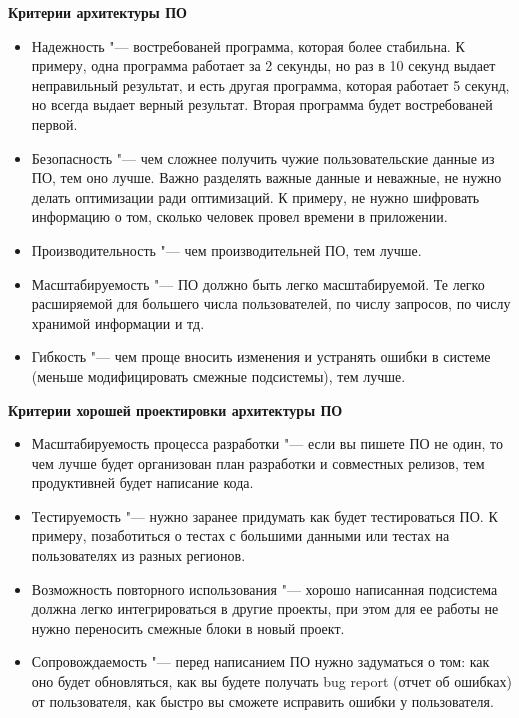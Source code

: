 \documentclass[bachelor, och, pract]{SCWorks}
\theoremstyle{remark}
\begin{document}
    \hfill \break
    \textbf{Критерии архитектуры ПО}

    \begin{itemize}[label=$\bullet$]
        \item Надежность "--- востребованей программа, которая более стабильна. К примеру, одна программа работает за 2 секунды, но раз в 10 секунд выдает неправильный результат, и есть другая программа, которая работает 5 секунд, но всегда выдает верный результат. Вторая программа будет востребованей первой.
        \item Безопасность "--- чем сложнее получить чужие пользовательские данные из ПО, тем оно лучше. Важно разделять важные данные и неважные, не нужно делать оптимизации ради оптимизаций. К примеру, не нужно шифровать информацию о том, сколько человек провел времени в приложении. 
        \item Производительность "--- чем производительней ПО, тем лучше. 
        \item Масштабируемость "--- ПО должно быть легко масштабируемой. Те легко расширяемой для большего числа пользователей, по числу запросов, по числу хранимой информации и тд.
        \item Гибкость "--- чем проще вносить изменения и устранять ошибки в системе (меньше модифицировать смежные подсистемы), тем лучше.
    \end{itemize}

    \hfill \break
    \textbf{Критерии хорошей проектировки архитектуры ПО}

    \begin{itemize}[label=$\bullet$]
        \item Масштабируемость процесса разработки "--- если вы пишете ПО не один, то чем лучше будет организован план разработки и совместных релизов, тем продуктивней будет написание кода.
        \item Тестируемость "--- нужно заранее придумать как будет тестироваться ПО. К примеру, позаботиться о тестах с большими данными или тестах на пользователях из разных регионов.
        \item Возможность повторного использования "--- хорошо написанная подсистема должна легко интегрироваться в другие проекты, при этом для ее работы не нужно переносить смежные блоки в новый проект.
        \item Сопровождаемость "--- перед написанием ПО нужно задуматься о том: как оно будет обновляться, как вы будете получать bug report (отчет об ошибках) от пользователя, как быстро вы сможете исправить ошибки у пользователя.
    \end{itemize}
\end{document}
